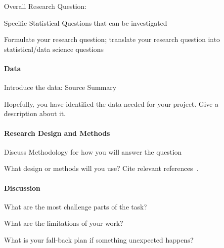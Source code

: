 \documentclass[12pt]{article}
\begin{document}
Overall Research Question:

Specific Statistical Questions that can be investigated

Formulate your research question;
translate your research question into statistical/data science questions

\paragraph{Data}

Introduce the data:
Source
Summary

Hopefully, you have identified the data needed for your project. Give a
description about it.

\paragraph{Research Design and Methods}

Discuss Methodology for how you will answer the question

What design or methods will you use?
Cite relevant references~\citep[e.g.,][]{wild2004global}.

\paragraph{Discussion}
What are the most challenge parts of the task?

What are the limitations of your work?

What is your fall-back plan if
something unexpected happens?



\end{document}
